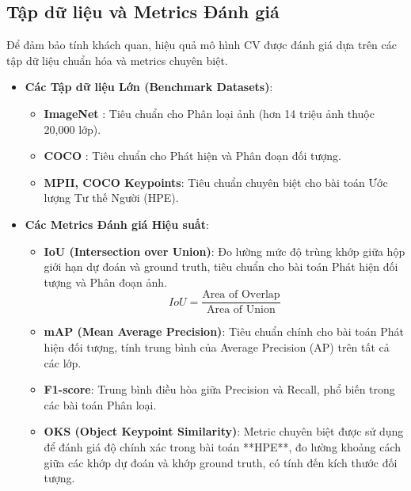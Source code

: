 \subsection{Tập dữ liệu và Metrics Đánh giá}
Để đảm bảo tính khách quan, hiệu quả mô hình CV được đánh giá dựa trên các tập dữ liệu chuẩn hóa và metrics chuyên biệt.

\begin{itemize}
    \item \textbf{Các Tập dữ liệu Lớn (Benchmark Datasets)}:
    \begin{itemize}
        \item \textbf{ImageNet} \cite{deng2009imagenet}: Tiêu chuẩn cho Phân loại ảnh (hơn 14 triệu ảnh thuộc 20,000 lớp).
        \item \textbf{COCO} \cite{lin2014microsoft}: Tiêu chuẩn cho Phát hiện và Phân đoạn đối tượng.
        \item \textbf{MPII, COCO Keypoints}: Tiêu chuẩn chuyên biệt cho bài toán Ước lượng Tư thế Người (HPE).
    \end{itemize}
    \item \textbf{Các Metrics Đánh giá Hiệu suất}: 
    \begin{itemize}
        \item \textbf{IoU (Intersection over Union)}: Đo lường mức độ trùng khớp giữa hộp giới hạn dự đoán và ground truth, tiêu chuẩn cho bài toán Phát hiện đối tượng và Phân đoạn ảnh.
        $$ IoU = \frac{\text{Area of Overlap}}{\text{Area of Union}} $$
        \item \textbf{mAP (Mean Average Precision)}: Tiêu chuẩn chính cho bài toán Phát hiện đối tượng, tính trung bình của Average Precision (AP) trên tất cả các lớp.
        \item \textbf{F1-score}: Trung bình điều hòa giữa Precision và Recall, phổ biến trong các bài toán Phân loại.
        \item \textbf{OKS (Object Keypoint Similarity)}: Metric chuyên biệt được sử dụng để đánh giá độ chính xác trong bài toán **HPE**, đo lường khoảng cách giữa các khớp dự đoán và khớp ground truth, có tính đến kích thước đối tượng.
    \end{itemize}
\end{itemize}
